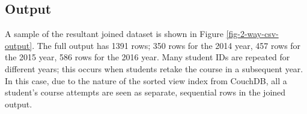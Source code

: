 

\subsection{Output}
A sample of the resultant joined dataset is shown in Figure \ref{fig-2-way-csv-output}. The full output has 1391 rows; 350 rows for the 2014 year, 457 rows for the 2015 year, 586 rows for the 2016 year. Many student IDs are repeated for different years; this occurs when students retake the course in a subsequent year. In this case, due to the nature of the sorted view index from CouchDB, all a student's course attempts are seen as separate, sequential rows in the joined output.

